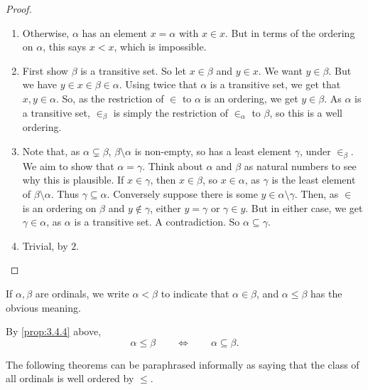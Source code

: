 \begin{proof}
\hfill
\begin{enumerate}
\item Otherwise, $ \alpha $ has an element $ x = \alpha $ with $ x \in x $. But in terms of the ordering on $ \alpha $, this says $ x < x $, which is impossible.
\item First show $ \beta $ is a transitive set. So let $ x \in \beta $ and $ y \in x $. We want $ y \in \beta $. But we have $ y \in x \in \beta \in \alpha $. Using twice that $ \alpha $ is a transitive set, we get that $ x, y \in \alpha $. So, as the restriction of $ \in $ to $ \alpha $ is an ordering, we get $ y \in \beta $. As $ \alpha $ is a transitive set, $ \in_\beta $ is simply the restriction of $ \in_\alpha $ to $ \beta $, so this is a well ordering.
\item Note that, as $ \alpha \subsetneq \beta $, $ \beta \setminus \alpha $ is non-empty, so has a least element $ \gamma $, under $ \in_\beta $. We aim to show that $ \alpha = \gamma $. Think about $ \alpha $ and $ \beta $ as natural numbers to see why this is plausible. If $ x \in \gamma $, then $ x \in \beta $, so $ x \in \alpha $, as $ \gamma $ is the least element of $ \beta \setminus \alpha $. Thus $ \gamma \subseteq \alpha $. Conversely suppose there is some $ y \in \alpha \setminus \gamma $. Then, as $ \in $ is an ordering on $ \beta $ and $ y \notin \gamma $, either $ y = \gamma $ or $ \gamma \in y $. But in either case, we get $ \gamma \in \alpha $, as $ \alpha $ is a transitive set. A contradiction. So $ \alpha \subseteq \gamma $.
\item Trivial, by $ 2 $.
\end{enumerate}
\end{proof}

\pagebreak

\begin{definition}
If $ \alpha, \beta $ are ordinals, we write $ \alpha < \beta $ to indicate that $ \alpha \in \beta $, and $ \alpha \le \beta $ has the obvious meaning.
\end{definition}

\begin{note}
By \ref{prop:3.4.4} above,
$$ \alpha \le \beta \qquad \iff \qquad \alpha \subseteq \beta. $$
\end{note}

The following theorems can be paraphrased informally as saying that the class of all ordinals is well ordered by $ \le $.

